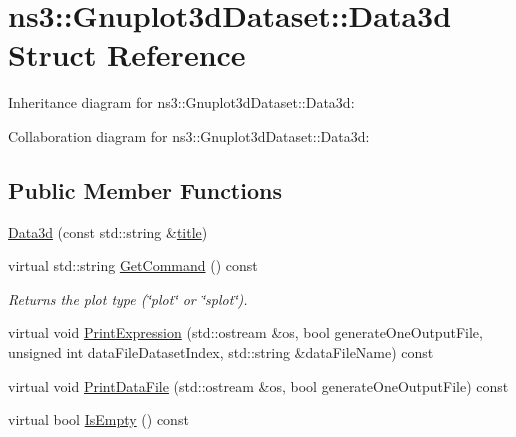 \hypertarget{structns3_1_1Gnuplot3dDataset_1_1Data3d}{}\section{ns3\+:\+:Gnuplot3d\+Dataset\+:\+:Data3d Struct Reference}
\label{structns3_1_1Gnuplot3dDataset_1_1Data3d}


Inheritance diagram for ns3\+:\+:Gnuplot3d\+Dataset\+:\+:Data3d\+:


Collaboration diagram for ns3\+:\+:Gnuplot3d\+Dataset\+:\+:Data3d\+:
\subsection*{Public Member Functions}
\begin{DoxyCompactItemize}
\item 
\hyperlink{structns3_1_1Gnuplot3dDataset_1_1Data3d_afcd105210f61b999f25343cf1945bada}{Data3d} (const std\+::string \&\hyperlink{lte__link__budget__x2__handover__measures_8m_a3f4b991df405379f6917e1683ed5a8c8}{title})
\item 
virtual std\+::string \hyperlink{structns3_1_1Gnuplot3dDataset_1_1Data3d_a1a497eae374a9162d29096cb2e778c03}{Get\+Command} () const 
\begin{DoxyCompactList}\small\item\em Returns the plot type (\char`\"{}plot\char`\"{} or \char`\"{}splot\char`\"{}). \end{DoxyCompactList}\item 
virtual void \hyperlink{structns3_1_1Gnuplot3dDataset_1_1Data3d_a6f585fc26fed02e2be0b9fa56e08e8c3}{Print\+Expression} (std\+::ostream \&os, bool generate\+One\+Output\+File, unsigned int data\+File\+Dataset\+Index, std\+::string \&data\+File\+Name) const 
\item 
virtual void \hyperlink{structns3_1_1Gnuplot3dDataset_1_1Data3d_a948688561dd3bd547f755ea548782153}{Print\+Data\+File} (std\+::ostream \&os, bool generate\+One\+Output\+File) const 
\item 
virtual bool \hyperlink{structns3_1_1Gnuplot3dDataset_1_1Data3d_a3f77be44f8e4c9915a3ecdf3635b76f3}{Is\+Empty} () const 
\end{DoxyCompactItemize}
